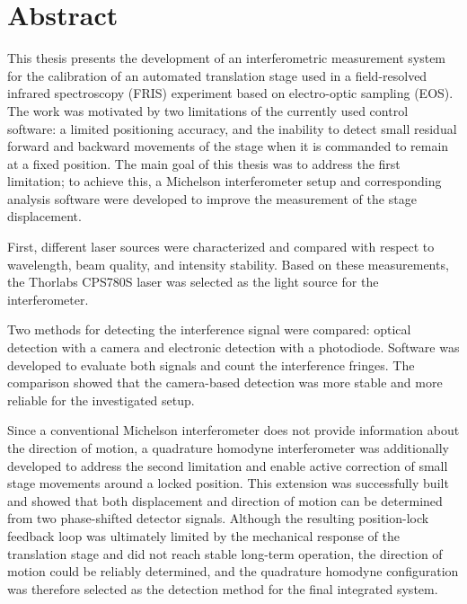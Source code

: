 \chapter*{Abstract}
\thispagestyle{empty}

This thesis presents the development of an interferometric measurement system for the calibration of an automated translation stage used in a field-resolved infrared spectroscopy (FRIS) experiment based on electro-optic sampling (EOS). The work was motivated by two limitations of the currently used control software: a limited positioning accuracy, and the inability to detect small residual forward and backward movements of the stage when it is commanded to remain at a fixed position. The main goal of this thesis was to address the first limitation; to achieve this, a Michelson interferometer setup and corresponding analysis software were developed to improve the measurement of the stage displacement.

First, different laser sources were characterized and compared with respect to wavelength, beam quality, and intensity stability. Based on these measurements, the Thorlabs CPS780S laser was selected as the light source for the interferometer.

 Two methods for detecting the interference signal were compared: optical detection with a camera and electronic detection with a photodiode. Software was developed to evaluate both signals and count the interference fringes. The comparison showed that the camera-based detection was more stable and more reliable for the investigated setup.

Since a conventional Michelson interferometer does not provide information about the direction of motion, a quadrature homodyne interferometer was additionally developed to address the second limitation and enable active correction of small stage movements around a locked position. This extension was successfully built and showed that both displacement and direction of motion can be determined from two phase-shifted detector signals. Although the resulting position-lock feedback loop was ultimately limited by the mechanical response of the translation stage and did not reach stable long-term operation, the direction of motion could be reliably determined, and the quadrature homodyne configuration was therefore selected as the detection method for the final integrated system.

